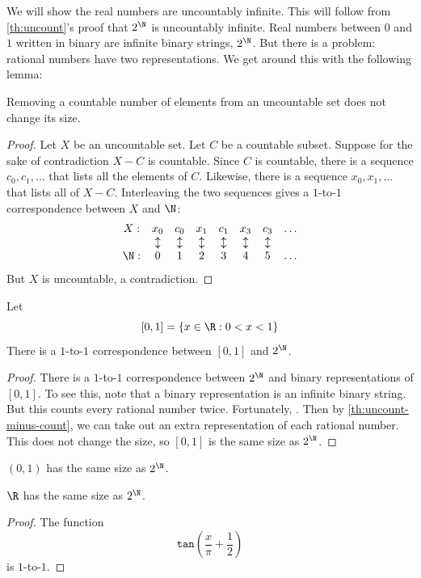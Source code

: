 \documentclass{scrbook}
\renewcommand{\tan}{\texttt{tan}}
\begin{document}
We will show the real numbers are uncountably infinite. This will follow from \cref{th:uncount}'s proof that $2^\N$ is uncountably infinite. Real numbers between $0$ and $1$ written in binary are infinite binary strings, $2^\N$. But there is a problem: rational numbers have two representations. We get around this with the following lemma:

\begin{lemma}\label{th:uncount-minus-count}
  Removing a countable number of elements from an uncountable set does not change its size. 
\end{lemma}
\begin{proof}
  Let $X$ be an uncountable set. Let $C$ be a countable subset. Suppose for the sake of contradiction $X-C$ is countable. Since $C$ is countable, there is a sequence $c_0,c_1,\dots$ that lists all the elements of $C$. Likewise, there is a sequence $x_0,x_1,\dots$ that lists all of $X-C$. Interleaving the two sequences gives a $1$-to-$1$ correspondence between $X$ and $\N$:
  \[
  \begin{matrix}
    X:  & x_0 & c_0 & x_1 & c_1 & x_3 & c_3 & \dots \\
    {}  & \updownarrow &\updownarrow &\updownarrow &\updownarrow &\updownarrow &\updownarrow & \\
    \N: & 0 & 1 & 2 & 3 & 4 & 5 &\dots
  \end{matrix}
  \]
  But $X$ is uncountable, a contradiction. 
\end{proof}

\begin{theorem}
  Let
  \[
  [0,1]=\{x\in\R:0<x<1\}
  \]
  There is a $1$-to-$1$ correspondence between $[0,1]$ and $2^\N$.
\end{theorem}
\begin{proof}
  There is a $1$-to-$1$ correspondence between $2^\N$ and binary representations of $[0,1]$. To see this, note that a binary representation is an infinite binary string. But this counts every rational number twice. Fortunately, . Then by \cref{th:uncount-minus-count}, we can take out an extra representation of each rational number. This does not change the size, so $[0,1]$ is the same size as $2^\N$. 
\end{proof}
\begin{cor}
  $(0,1)$ has the same size as $2^\N$. 
\end{cor}
\begin{cor}
  $\R$ has the same size as $2^\N$. 
\end{cor}
\begin{proof}
  The function
  \[
  \tan\left(\frac x\pi +\frac 12\right)
  \]
  is $1$-to-$1$. 
\end{proof}
\end{document}

